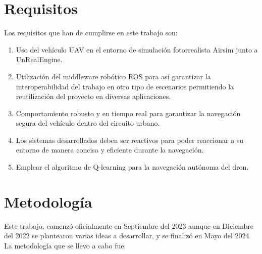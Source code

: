 \section{Requisitos}
\label{sec:requisitos}

Los requisitos que han de cumplirse en este trabajo son: 
\begin{enumerate}
    \item Uso del vehículo UAV en el entorno de simulación fotorrealista Airsim junto a UnRealEngine.
    \item Utilización del middleware robótico ROS para así garantizar la interoperabilidad del trabajo en otro tipo de escenarios permitiendo
    la reutilización del proyecto en diversas aplicaciones. 
    \item Comportamiento robusto y en tiempo real para garantizar la navegación segura del vehículo dentro del circuito urbano.
    \item Los sistemas desarrollados deben ser reactivos para poder reaccionar a su entorno de manera concisa y eficiente durante
    la navegación.
    \item Emplear el algoritmo de Q-learning para la navegación autónoma del dron. 
\end{enumerate}


\section{Metodología}
\label{sec:metodologia}

Este trabajo, comenzó oficialmente en Septiembre del 2023 aunque en Diciembre del 2022 se plantearon varias ideas a desarrollar, y se finalizó en Mayo del 2024. \\

La metodología que se llevo a cabo fue:

